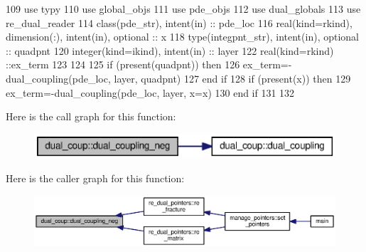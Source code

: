 \begin{DoxyCode}
109       \textcolor{keywordtype}{use }typy
110       \textcolor{keywordtype}{use }global_objs
111       \textcolor{keywordtype}{use }pde_objs
112       \textcolor{keywordtype}{use }dual_globals
113       \textcolor{keywordtype}{use }re_dual_reader
114       \textcolor{keywordtype}{class}(pde_str), \textcolor{keywordtype}{intent(in)} :: pde\_loc
116       \textcolor{keywordtype}{real(kind=rkind)}, \textcolor{keywordtype}{dimension(:)}, \textcolor{keywordtype}{intent(in)}, \textcolor{keywordtype}{optional}    :: x
118       \textcolor{keywordtype}{type}(integpnt_str), \textcolor{keywordtype}{intent(in)}, \textcolor{keywordtype}{optional} :: quadpnt
120       \textcolor{keywordtype}{integer(kind=ikind)}, \textcolor{keywordtype}{intent(in)} :: layer
122       \textcolor{keywordtype}{real(kind=rkind)}   ::ex\_term
123           
124             
125       \textcolor{keywordflow}{if} (\textcolor{keyword}{present}(quadpnt)) \textcolor{keywordflow}{then}
126         ex\_term=-dual\_coupling(pde\_loc, layer, quadpnt)
127 \textcolor{keywordflow}{      end if}
128       \textcolor{keywordflow}{if} (\textcolor{keyword}{present}(x)) \textcolor{keywordflow}{then}
129         ex\_term=-dual\_coupling(pde\_loc, layer, x=x)
130 \textcolor{keywordflow}{      end if}
131 
132      
\end{DoxyCode}


Here is the call graph for this function\+:\nopagebreak
\begin{figure}[H]
\begin{center}
\leavevmode
\includegraphics[width=350pt]{namespacedual__coup_a392d4e7e0705fd62f272c62ab400ae68_cgraph}
\end{center}
\end{figure}




Here is the caller graph for this function\+:\nopagebreak
\begin{figure}[H]
\begin{center}
\leavevmode
\includegraphics[width=350pt]{namespacedual__coup_a392d4e7e0705fd62f272c62ab400ae68_icgraph}
\end{center}
\end{figure}


